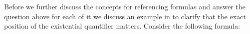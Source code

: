 Before we further discuss the concepts for referencing formulas and answer the question above for each of it 
we discuss an example in \nthree to clarify that the exact position of the existential quantifier matters.
Consider the following formula:
% 
% 
% 
% 
% 
% 
